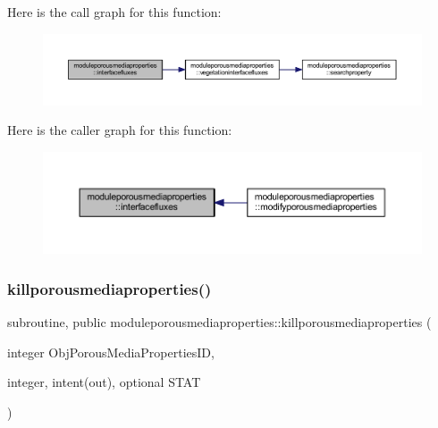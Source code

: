 Here is the call graph for this function\+:\nopagebreak
\begin{figure}[H]
\begin{center}
\leavevmode
\includegraphics[width=350pt]{namespacemoduleporousmediaproperties_a9754a9e3d41ba3152a613bda8646ffae_cgraph}
\end{center}
\end{figure}
Here is the caller graph for this function\+:\nopagebreak
\begin{figure}[H]
\begin{center}
\leavevmode
\includegraphics[width=350pt]{namespacemoduleporousmediaproperties_a9754a9e3d41ba3152a613bda8646ffae_icgraph}
\end{center}
\end{figure}
\mbox{\label{namespacemoduleporousmediaproperties_a735090aa674c6c295828243dcd120d40}} 
\subsubsection{\texorpdfstring{killporousmediaproperties()}{killporousmediaproperties()}}
{\footnotesize\ttfamily subroutine, public moduleporousmediaproperties\+::killporousmediaproperties (\begin{DoxyParamCaption}\item[{integer}]{Obj\+Porous\+Media\+Properties\+ID,  }\item[{integer, intent(out), optional}]{S\+T\+AT }\end{DoxyParamCaption})}

